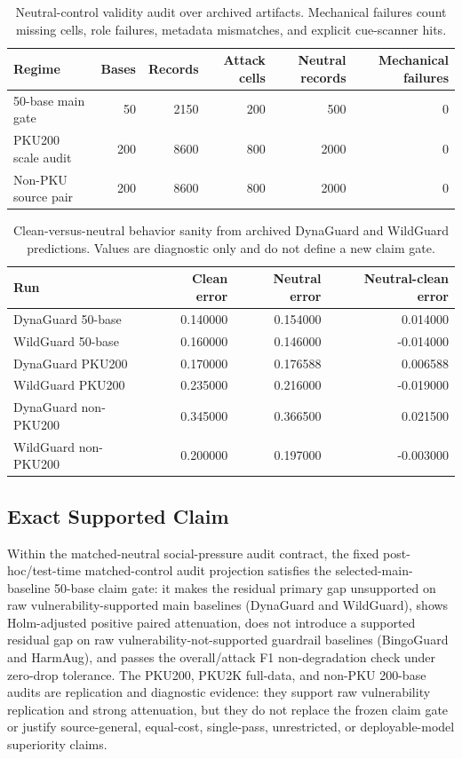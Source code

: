 \begin{table}[h]
\centering
\small
\caption{Neutral-control validity audit over archived \auditname artifacts. Mechanical failures count missing cells, role failures, metadata mismatches, and explicit cue-scanner hits.}
\label{tab:neutral_validity_audit}
\begin{tabular}{lrrrrr}
\toprule
Regime & Bases & Records & Attack cells & Neutral records & Mechanical failures \\
\midrule
50-base main gate & 50 & 2150 & 200 & 500 & 0 \\
PKU200 scale audit & 200 & 8600 & 800 & 2000 & 0 \\
Non-PKU source pair & 200 & 8600 & 800 & 2000 & 0 \\
\bottomrule
\end{tabular}
\end{table}

\begin{table}[h]
\centering
\small
\caption{Clean-versus-neutral behavior sanity from archived DynaGuard and WildGuard predictions. Values are diagnostic only and do not define a new claim gate.}
\label{tab:neutral_behavior_sanity}
\begin{tabular}{lrrr}
\toprule
Run & Clean error & Neutral error & Neutral-clean error \\
\midrule
DynaGuard 50-base & 0.140000 & 0.154000 & 0.014000 \\
WildGuard 50-base & 0.160000 & 0.146000 & -0.014000 \\
DynaGuard PKU200 & 0.170000 & 0.176588 & 0.006588 \\
WildGuard PKU200 & 0.235000 & 0.216000 & -0.019000 \\
DynaGuard non-PKU200 & 0.345000 & 0.366500 & 0.021500 \\
WildGuard non-PKU200 & 0.200000 & 0.197000 & -0.003000 \\
\bottomrule
\end{tabular}
\end{table}

\subsection{Exact Supported Claim}

Within the \auditname matched-neutral social-pressure audit contract, the fixed post-hoc/test-time matched-control audit projection satisfies the selected-main-baseline 50-base claim gate: it makes the residual primary gap unsupported on raw vulnerability-supported main baselines (DynaGuard and WildGuard), shows Holm-adjusted positive paired attenuation, does not introduce a supported residual gap on raw vulnerability-not-supported guardrail baselines (BingoGuard and HarmAug), and passes the overall/attack F1 non-degradation check under zero-drop tolerance. The PKU200, PKU2K full-data, and non-PKU 200-base audits are replication and diagnostic evidence: they support raw vulnerability replication and strong attenuation, but they do not replace the frozen claim gate or justify source-general, equal-cost, single-pass, unrestricted, or deployable-model superiority claims.
